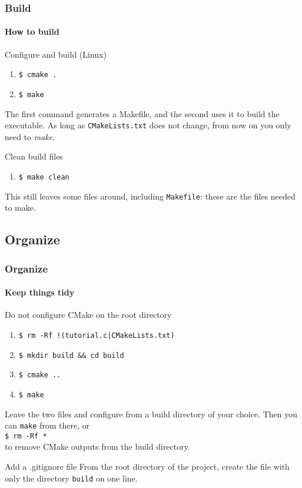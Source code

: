 \begin{frame}
\frametitle{Build}
\framesubtitle{How to build}

\begin{block}{Configure and build (Linux)}
\begin{enumerate}
\item \texttt{\$ cmake .} 
\item \texttt{\$ make}
\end{enumerate}
The first command generates a Makefile, and the second uses it to build the executable. As long as \texttt{CMakeLists.txt} does not change, from now on you only need to {\em make}.
\end{block}
\pause
\begin{block}{Clean build files}
\begin{enumerate}
\item \texttt{\$ make clean}
\end{enumerate}
This still leaves some files around, including \texttt{Makefile}: these are the files needed to make.
\end{block}

\end{frame}

\subsection{Organize}

\begin{frame}
\frametitle{Organize}
\framesubtitle{Keep things tidy}

\begin{block}{Do not configure CMake on the root directory}
\begin{enumerate}
\item \texttt{\$ rm -Rf !(tutorial.c|CMakeLists.txt)}
\item \texttt{\$ mkdir build \&\& cd build}
\item \texttt{\$ cmake ..}
\item \texttt{\$ make}
\end{enumerate}
Leave the two files and configure from a build directory of your choice. Then you can \texttt{make} from there, or \\ \texttt{\$ rm -Rf *} \\ to remove CMake outputs from the build directory.
\end{block}
\pause
\begin{block}{Add a .gitignore file}
From the root directory of the project, create the file with only the directory \texttt{build} on one line.
\end{block}

\end{frame}

